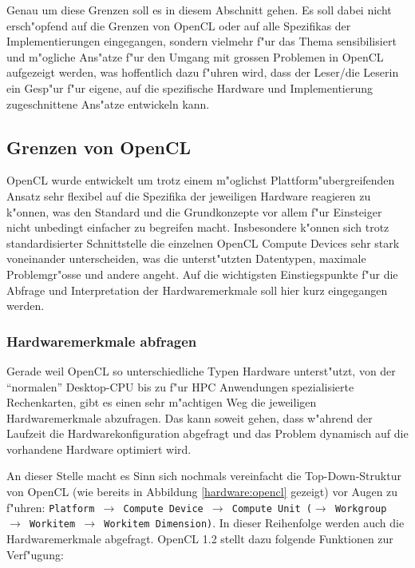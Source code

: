\begin{refsection}
Genau um diese Grenzen soll es in diesem Abschnitt gehen. Es soll dabei nicht
ersch"opfend auf die Grenzen von OpenCL oder auf alle Spezifikas der 
Implementierungen eingegangen, sondern vielmehr f"ur das Thema sensibilisiert 
und m"ogliche Ans"atze f"ur den Umgang mit grossen Problemen in OpenCL aufgezeigt
werden, was hoffentlich dazu f"uhren wird, dass der Leser/die Leserin ein Gesp"ur 
f"ur eigene, auf die spezifische Hardware und Implementierung zugeschnittene 
Ans"atze entwickeln kann.


\subsection{Grenzen von OpenCL}

OpenCL wurde entwickelt um trotz einem m"oglichst Plattform"ubergreifenden Ansatz 
sehr flexibel auf die Spezifika der jeweiligen Hardware reagieren zu k"onnen, was
den Standard und die Grundkonzepte vor allem f"ur Einsteiger nicht unbedingt 
einfacher zu begreifen macht. Insbesondere k"onnen sich trotz standardisierter 
Schnittstelle die einzelnen OpenCL Compute Devices sehr stark voneinander unterscheiden,
was die unterst"utzten Datentypen, maximale Problemgr"osse und andere angeht.
Auf die wichtigsten Einstiegspunkte f"ur die Abfrage und Interpretation der 
Hardwaremerkmale soll hier kurz eingegangen werden.


\subsubsection{Hardwaremerkmale abfragen}

Gerade weil OpenCL so unterschiedliche Typen Hardware unterst"utzt, von der ``normalen''
Desktop-CPU bis zu f"ur HPC Anwendungen spezialisierte Rechenkarten, gibt es einen
sehr m"achtigen Weg die jeweiligen Hardwaremerkmale abzufragen. Das kann soweit 
gehen, dass w"ahrend der Laufzeit die Hardwarekonfiguration abgefragt und das 
Problem dynamisch auf die vorhandene Hardware optimiert wird.

An dieser Stelle macht es Sinn sich nochmals vereinfacht die Top-Down-Struktur
von OpenCL (wie bereits in Abbildung \ref{hardware:opencl} gezeigt) vor Augen zu
f"uhren: \texttt{Platform $\rightarrow$ Compute Device $\rightarrow$ Compute
	Unit ($\rightarrow$ Workgroup $\rightarrow$ Workitem $\rightarrow$ Workitem
Dimension)}. In dieser Reihenfolge werden auch die Hardwaremerkmale abgefragt.
OpenCL 1.2 stellt dazu folgende Funktionen zur Verf"ugung:


\end{refsection}
